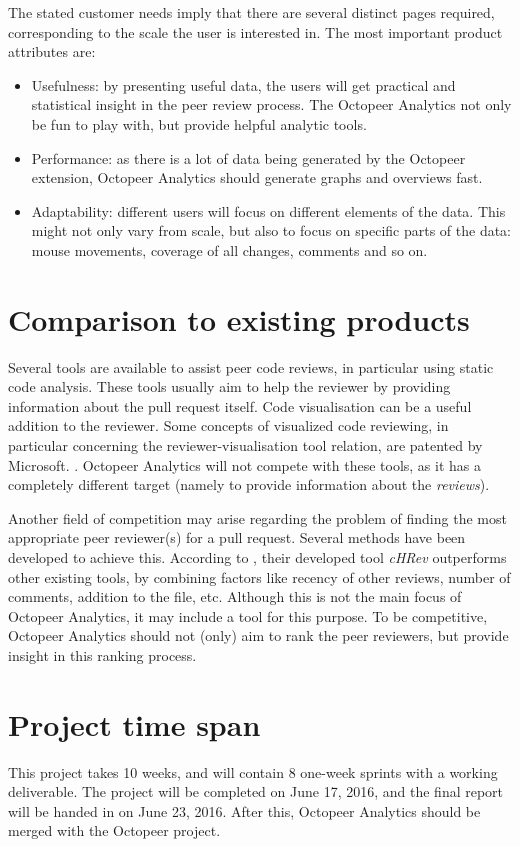 \documentclass{article}
\begin{document}
The stated customer needs imply that there are several distinct pages required, corresponding to the scale the user is interested in. The most important product attributes are:
\begin{itemize}
\item Usefulness: by presenting useful data, the users will get practical and statistical insight in the peer review process. The Octopeer Analytics not only be fun to play with, but provide helpful analytic tools.
\item Performance: as there is a lot of data being generated by the Octopeer extension, Octopeer Analytics should generate graphs and overviews fast.
\item Adaptability: different users will focus on different elements of the data. This might not only vary from scale, but also to focus on specific parts of the data: mouse movements, coverage of all changes, comments and so on.
\end{itemize}

\section{Comparison to existing products} \label{section:comparisontoexistingproducts}
Several tools are available to assist peer code reviews, in particular using static code analysis. \parencite{reviewtools} These tools usually aim to help the reviewer by providing information about the pull request itself. Code visualisation can be a useful addition to the reviewer. Some concepts of visualized code reviewing, in particular concerning the reviewer-visualisation tool relation, are patented by Microsoft. \parencite{wang2015visualized}. Octopeer Analytics will not compete with these tools, as it has a completely different target (namely to provide information about the \textit{reviews}).

Another field of competition may arise regarding the problem of finding the most appropriate peer reviewer(s) for a pull request. Several methods have been developed to achieve this. According to  \cite{automaticallyrecommending}, their developed tool \textit{cHRev} outperforms other existing tools, by combining factors like recency of other reviews, number of comments, addition to the file, etc. Although this is not the main focus of Octopeer Analytics, it may include a tool for this purpose. To be competitive, Octopeer Analytics should not (only) aim to rank the peer reviewers, but provide insight in this ranking process.

\section{Project time span} \label{section:projecttimespan}
This project takes 10 weeks, and will contain 8 one-week sprints with a working deliverable. The project will be completed on June 17, 2016, and the final report will be handed in on June 23, 2016. After this, Octopeer Analytics should be merged with the Octopeer project.

\printbibliography 
\end{document}
